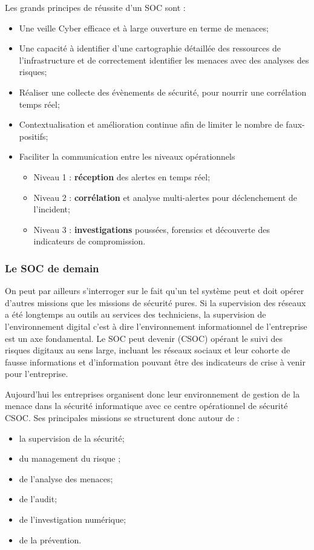 Les grands principes de réussite d’un SOC sont : 

\begin{itemize}
  \item Une veille Cyber efficace et à large ouverture en terme de menaces;
  \item Une capacité à identifier d’une cartographie détaillée des ressources de l’infrastructure et de correctement identifier les menaces avec des analyses des risques;
  \item Réaliser une collecte des évènements de sécurité, pour nourrir une corrélation temps réel;
  \item Contextualisation et amélioration continue afin de limiter le nombre de faux-positifs;
  \item Faciliter la communication entre les niveaux opérationnels
\begin{itemize}
\item Niveau 1 : \textbf{réception} des alertes en temps réel;
\item Niveau 2 : \textbf{corrélation} et analyse multi-alertes pour déclenchement de l’incident;
\item Niveau 3 : \textbf{investigations} poussées, forensics et découverte des indicateurs de compromission.
\end{itemize}
\end{itemize}


\subsubsection{Le SOC de demain}
On peut par ailleurs s'interroger sur le fait qu'un tel système peut et doit opérer d'autres missions que les missions de sécurité pures. Si la supervision des réseaux a été longtemps au outils au services des techniciens, la supervision de l'environnement digital c'est à dire l'environnement informationnel de l'entreprise est un axe fondamental. Le SOC peut devenir  (CSOC) opérant le suivi des risques digitaux au sens large, incluant les réseaux sociaux et leur cohorte de fausse informations et d'information pouvant être des indicateurs de crise à venir pour l'entreprise.

Aujourd’hui les entreprises organisent donc leur environnement de gestion de la menace dans la sécurité informatique avec ce centre opérationnel de sécurité CSOC. Ses principales missions se structurent donc autour de  : 

\begin{itemize}
  \item la supervision de la sécurité;
  \item du management du risque ;
  \item de l’analyse des menaces;
  \item de l’audit;
  \item de l’investigation numérique;
  \item de la prévention.
\end{itemize}

